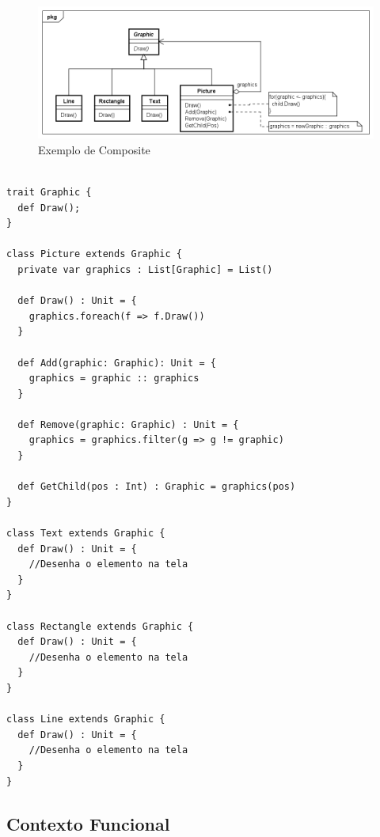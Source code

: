 \begin{figure}[htb]
	\caption{\label{composite_exemplo}Exemplo de Composite}
	\begin{center}
	    \includegraphics[scale=0.5]{5_padroes-contexto-funcional/5.2_estruturais/5.2.3_composite/composite_exemplo.png}
	\end{center}
\end{figure}

\begin{lstlisting}[caption={Composite Orientado a Objetos},label=oocomposite]

trait Graphic {
  def Draw();
}

class Picture extends Graphic {
  private var graphics : List[Graphic] = List()

  def Draw() : Unit = {
    graphics.foreach(f => f.Draw())
  }

  def Add(graphic: Graphic): Unit = {
    graphics = graphic :: graphics
  }

  def Remove(graphic: Graphic) : Unit = {
    graphics = graphics.filter(g => g != graphic)
  }

  def GetChild(pos : Int) : Graphic = graphics(pos)
}

class Text extends Graphic {
  def Draw() : Unit = {
    //Desenha o elemento na tela
  }
}

class Rectangle extends Graphic {
  def Draw() : Unit = {
    //Desenha o elemento na tela
  }
}

class Line extends Graphic {
  def Draw() : Unit = {
    //Desenha o elemento na tela
  }
}

\end{lstlisting}

\subsection*{Contexto Funcional}



\begin{lstlisting}[caption={Composite Funcional},label=fpcomposite]
    

    
\end{lstlisting}